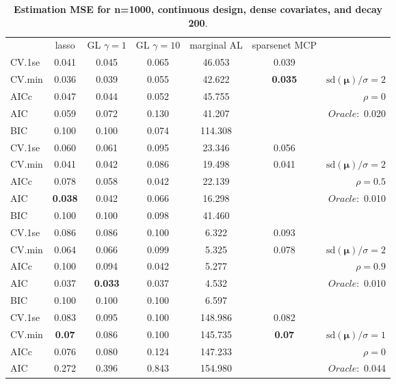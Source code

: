 \clearpage
\begin{table}\vspace{-.5cm}
\caption[l]{ { \bf Estimation MSE for n=1000, continuous design, 
dense covariates, and  decay  200}.}
\vspace{-.5cm}
\footnotesize{}
\begin{center}
\begin{tabular}{l*{5}{c}|r}
& lasso & GL $\gamma=1$ & GL $\gamma=10$ & marginal AL & sparsenet MCP  & \\
 \cline{1-7}
CV.1se & 0.041 & 0.045 & 0.065 & 46.053 & 0.039 & \\
CV.min & 0.036 & 0.039 & 0.055 & 42.622 & {\bf 0.035} &  $\mathrm{sd}(\mathbf{\mu})/\sigma=2$ \\
AICc & 0.047 & 0.044 & 0.052 & 45.755 & & $\rho=0$ \\
AIC & 0.059 & 0.072 & 0.130 & 41.207 & &  \multirow{2}{*}{$Oracle: $ 0.020} \\
BIC & 0.100 & 0.100 & 0.074 & 114.308 & &  \\
 \hline 
CV.1se & 0.060 & 0.061 & 0.095 & 23.346 & 0.056 & \\
CV.min & 0.041 & 0.042 & 0.086 & 19.498 & 0.041 &  $\mathrm{sd}(\mathbf{\mu})/\sigma=2$ \\
AICc & 0.078 & 0.058 & 0.042 & 22.139 & & $\rho=0.5$ \\
AIC & {\bf 0.038} & 0.042 & 0.066 & 16.298 & &  \multirow{2}{*}{$Oracle: $ 0.010} \\
BIC & 0.100 & 0.100 & 0.098 & 41.460 & &  \\
 \hline 
CV.1se & 0.086 & 0.086 & 0.100 & 6.322 & 0.093 & \\
CV.min & 0.064 & 0.066 & 0.099 & 5.325 & 0.078 &  $\mathrm{sd}(\mathbf{\mu})/\sigma=2$ \\
AICc & 0.100 & 0.094 & 0.042 & 5.277 & & $\rho=0.9$ \\
AIC & 0.037 & {\bf 0.033} & 0.037 & 4.532 & &  \multirow{2}{*}{$Oracle: $ 0.010} \\
BIC & 0.100 & 0.100 & 0.100 & 6.597 & &  \\
 \hline 
CV.1se & 0.083 & 0.095 & 0.100 & 148.986 & 0.082 & \\
CV.min & {\bf 0.07} & 0.086 & 0.100 & 145.735 & {\bf 0.07} &  $\mathrm{sd}(\mathbf{\mu})/\sigma=1$ \\
AICc & 0.076 & 0.080 & 0.124 & 147.233 & & $\rho=0$ \\
AIC & 0.272 & 0.396 & 0.843 & 154.980 & &  \multirow{2}{*}{$Oracle: $ 0.044} \\

\end{tabular}
\end{center}
\end{table}
